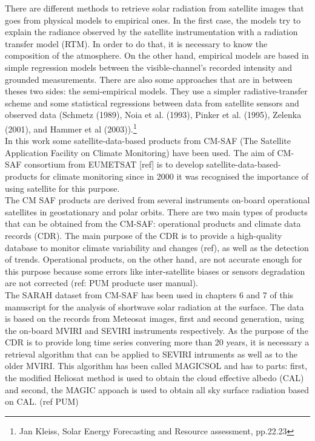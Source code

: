 There are different methods to retrieve solar radiation from satellite images that goes from physical models to empirical ones. In the first case, the models try to explain the radiance observed by the satellite instrumentation with a radiation transfer model (RTM). In order to do that, it is necessary to know the composition of the atmosphere. On the other hand, empirical models are based in simple regression models between the visible-channel's recorded intensity and grounded measurements. There are also some approaches that are in between theses two sides: the semi-empirical models. They use a simpler radiative-transfer scheme and some statistical regressions between data from satellite sensors and observed data (Schmetz (1989), Noia et al. (1993), Pinker et al. (1995), Zelenka (2001), and Hammer et al (2003)).\footnote{Jan Kleiss, Solar Energy Forecasting and Resource assessment, pp.22.23}\\

In this work some satellite-data-based products from CM-SAF (The Satellite Application Facility on Climate Monitoring) have been used. The aim of CM-SAF consortium from EUMETSAT [ref] is to develop satellite-data-based-products for climate monitoring since in 2000 it was recognised the importance of using satellite for this purpose.\\

The CM SAF products are derived from several instruments on-board operational satellites in geostationary and polar orbits. There are two main types of products that can be obtained from the CM-SAF: operational products and climate data records (CDR). The main purpose of the CDR is to provide a high-quality database to monitor climate variability and changes (ref), as well as the detection of trends. Operational products, on the other hand, are not accurate enough for this purpose because some errors like inter-satellite biases or sensors degradation are not corrected (ref: PUM producte user manual).\\


The SARAH dataset from CM-SAF has been used in chapters 6 and 7 of this manuscript for the analysis of shortwave solar radiation at the surface. The data is based on the records from Meteosat images, first and second generation, using the on-board MVIRI and SEVIRI instruments respectively. As the purpose of the CDR is to provide long time series convering more than 20 years, it is necessary a retrieval algorithm that can be applied to SEVIRI intruments as well as to the older MVIRI. This algorithm has been called MAGICSOL and has to parts: first, the modified Heliosat method is used to obtain the cloud effective albedo (CAL) and second, the MAGIC appoach is used to obtain all sky surface radiation based on CAL. (ref PUM)\\

